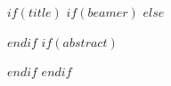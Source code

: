

$if(title)$
  $if(beamer)$
    \frame{\titlepage}
  $else$
    \maketitle
  $endif$
  $if(abstract)$
    \begin{abstract}
      $abstract$
    \end{abstract}
  $endif$
$endif$
